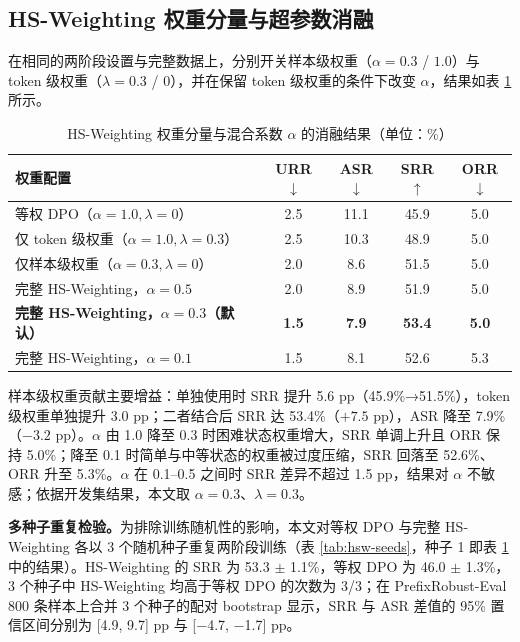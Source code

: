 \documentclass[fontset=fandol,type=master,campus=shenzhen,etitleauto=true]{hithesisbook}
\begin{document}
\subsection{HS-Weighting 权重分量与超参数消融}\label{rtw-results}

在相同的两阶段设置与完整数据上，分别开关样本级权重（$\alpha = 0.3$ / $1.0$）与 token 级权重（$\lambda = 0.3$ / $0$），并在保留 token 级权重的条件下改变 $\alpha$，结果如表 \ref{tab:rtw-results} 所示。

\begin{table}[htbp]
\centering
\caption{HS-Weighting 权重分量与混合系数 $\alpha$ 的消融结果（单位：\%）}
\label{tab:rtw-results}
\small
\setlength{\tabcolsep}{4pt}
\renewcommand{\arraystretch}{1.15}
\begin{tabular}{l c c c c}
\toprule
\textbf{权重配置} & \textbf{URR$\downarrow$} & \textbf{ASR$\downarrow$} & \textbf{SRR$\uparrow$} & \textbf{ORR$\downarrow$} \\
\midrule
等权 DPO（$\alpha=1.0, \lambda=0$） & 2.5 & 11.1 & 45.9 & 5.0 \\
仅 token 级权重（$\alpha=1.0, \lambda=0.3$） & 2.5 & 10.3 & 48.9 & 5.0 \\
仅样本级权重（$\alpha=0.3, \lambda=0$） & 2.0 & 8.6 & 51.5 & 5.0 \\
\midrule
完整 HS-Weighting，$\alpha=0.5$ & 2.0 & 8.9 & 51.9 & 5.0 \\
\textbf{完整 HS-Weighting，$\alpha=0.3$（默认）} & \textbf{1.5} & \textbf{7.9} & \textbf{53.4} & \textbf{5.0} \\
完整 HS-Weighting，$\alpha=0.1$ & 1.5 & 8.1 & 52.6 & 5.3 \\
\bottomrule
\end{tabular}
\end{table}

样本级权重贡献主要增益：单独使用时 SRR 提升 5.6 pp（45.9\%→51.5\%），token 级权重单独提升 3.0 pp；二者结合后 SRR 达 53.4\%（$+7.5$ pp），ASR 降至 7.9\%（$-3.2$ pp）。$\alpha$ 由 1.0 降至 0.3 时困难状态权重增大，SRR 单调上升且 ORR 保持 5.0\%；降至 0.1 时简单与中等状态的权重被过度压缩，SRR 回落至 52.6\%、ORR 升至 5.3\%。$\alpha$ 在 0.1--0.5 之间时 SRR 差异不超过 1.5 pp，结果对 $\alpha$ 不敏感；依据开发集结果，本文取 $\alpha = 0.3$、$\lambda = 0.3$。

\textbf{多种子重复检验。}为排除训练随机性的影响，本文对等权 DPO 与完整 HS-Weighting 各以 3 个随机种子重复两阶段训练（表 \ref{tab:hsw-seeds}，种子 1 即表 \ref{tab:rtw-results} 中的结果）。HS-Weighting 的 SRR 为 53.3 $\pm$ 1.1\%，等权 DPO 为 46.0 $\pm$ 1.3\%，3 个种子中 HS-Weighting 均高于等权 DPO 的次数为 3/3；在 PrefixRobust-Eval 800 条样本上合并 3 个种子的配对 bootstrap 显示，SRR 与 ASR 差值的 95\% 置信区间分别为 [4.9, 9.7] pp 与 [$-$4.7, $-$1.7] pp。
\end{document}
